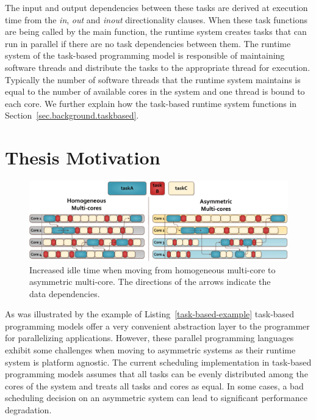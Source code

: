 The input and output dependencies between these tasks are derived at execution time from the \textit{in}, \textit{out} and \textit{inout} directionality clauses.
When these task functions are being called by the main function, the runtime system creates tasks that can run in parallel if there are no task dependencies between them.
The runtime system of the task-based programming model is responsible of maintaining software threads and distribute the tasks to the appropriate thread for execution.
Typically the number of software threads that the runtime system maintains is equal to the number of available cores in the system and one thread is bound to each core.
We further explain how the task-based runtime system functions in Section~\ref{sec.background.taskbased}.


\section{Thesis Motivation}
\begin{figure}[t]%
	\centering
	\includegraphics[width=\textwidth]{figures/thesis_motivation.pdf}
	\caption{Increased idle time when moving from homogeneous multi-core to asymmetric multi-core. The directions of the arrows indicate the data dependencies.}
	\label{fig:thesis_motivation}
\end{figure}

As was illustrated by the example of Listing~\ref{task-based-example} task-based programming models offer a very convenient abstraction layer to the programmer for parallelizing applications.
However, these parallel programming languages exhibit some challenges when moving to asymmetric systems as their runtime system is platform agnostic.
The current scheduling implementation in task-based programming models assumes that all tasks can be evenly distributed among the cores of the system and treats all tasks and cores as equal.
In some cases, a bad scheduling decision on an asymmetric system can lead to significant performance degradation. 

